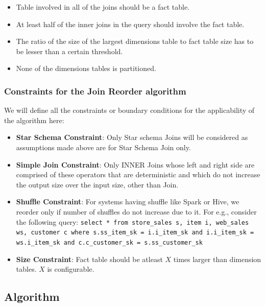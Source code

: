 \begin{itemize}
\item Table involved in all of the joins should be a fact table.
\item At least half of the inner joins in the query should involve the fact table.
\item The ratio of the size of the largest dimensions table to fact table size has to be lesser than a certain threshold.
\item None of the dimensions tables is partitioned.
\end{itemize}

\subsubsection{Constraints for the Join Reorder algorithm}
We will define all the constraints or boundary conditions for the applicability of the algorithm here:

\begin{itemize}
\item \textbf{Star Schema Constraint}: Only Star schema Joins will be considered as assumptions made above are for Star Schema Join only.
\item \textbf{Simple Join Constraint}: Only INNER Joins whose left and right side are comprised of these operators that are deterministic and which do not increase the output size over the input size, other than Join.
\item \textbf{Shuffle Constraint}: For systems having shuffle like Spark or Hive, we reorder only if number of shuffles do not increase due to it. For e.g., consider the following query: \texttt{select * from store\_sales s, item i, web\_sales ws, customer c where s.ss\_item\_sk = i.i\_item\_sk and i.i\_item\_sk = ws.i\_item\_sk and c.c\_customer\_sk = s.ss\_customer\_sk}
\item \textbf{Size Constraint}: Fact table should be atleast $X$ times larger than dimension tables. $X$ is configurable.
\end{itemize}

\subsection{Algorithm}

